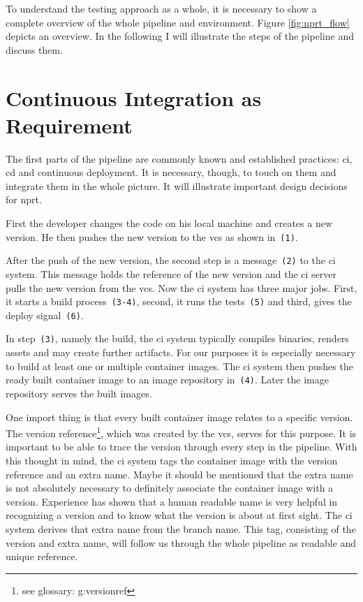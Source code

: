 To understand the testing approach as a whole, it is necessary to show a complete overview
of the whole pipeline and environment. Figure \ref{fig:nprt_flow} depicts an overview. In
the following I will illustrate the steps of the pipeline and discuss them.

\section{Continuous Integration as Requirement}

The first parts of the pipeline are commonly known and established practices: \gls{ci},
\gls{cd} and continuous deployment. It is necessary, though, to touch on them and
integrate them in the whole picture. It will illustrate important design decisions for
\gls{nprt}.

First the developer changes the code on his local machine and creates a new version. He
then pushes the new version to the \gls{vcs} as shown in~\texttt{(1)}.

After the push of the new version, the second step is a message~\texttt{(2)} to the
\gls{ci} system. This message holds the reference of the new version and the \gls{ci}
server pulls the new version from the \gls{vcs}. Now the \gls{ci} system has three major
jobs. First, it starts a build process~\texttt{(3-4)}, second, it runs the
tests~\texttt{(5)} and third, gives the deploy signal~\texttt{(6)}.

In step~\texttt{(3)}, namely the build, the \gls{ci} system typically compiles binaries,
renders assets and may create further artifacts. For our purposes it is especially
necessary to build at least one or multiple container images. The \gls{ci} system then
pushes the ready built container image to an image repository in~\texttt{(4)}. Later the
image repository serves the built images.

One import thing is that every built container image relates to a specific version. The
version reference\footnote{see glossary: \gls{g:versionref}}, which was created by the
\gls{vcs}, serves for this purpose. It is important to be able to trace the version
through every step in the pipeline. With this thought in mind, the \gls{ci} system tags
the container image with the version reference and an extra name. Maybe it should be
mentioned that the extra name is not absolutely necessary to definitely associate the
container image with a version. Experience has shown that a human readable name is very
helpful in recognizing a version and to know what the version is about at first sight. The
\gls{ci} system derives that extra name from the branch name. This tag, consisting of
the version and extra name, will follow us through the whole pipeline as readable and
unique reference.

